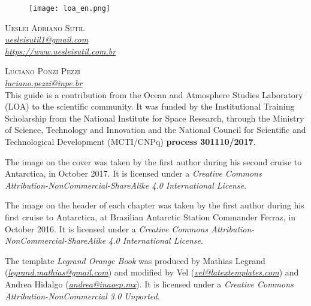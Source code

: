 \newpage
\thispagestyle{empty}

\begin{figure}[H]
    \centering
    \vspace*{\fill}
    \texttt{[image: loa\_en.png]}
    \vspace{0.5cm}
\end{figure}

\noindent \textsc{Ueslei Adriano Sutil} 
\\
\noindent \textcolor{bleu_cite}{\href{mailto:uesleisutil1@gmail.com}{\textit{uesleisutil1@gmail.com}}}
\\  %
\noindent \textcolor{bleu_cite}{\href{https://www.uesleisutil.com.br}{\textit{https://www.uesleisutil.com.br}}}
\bigskip

\noindent \textsc{Luciano Ponzi Pezzi}
\\
\noindent \textcolor{bleu_cite}{\href{mailto:luciano.pezzi@inpe.br}{\textit{luciano.pezzi@inpe.br}}}  %
\bigskip
\\

\noindent This guide is a contribution from the Ocean and Atmosphere Studies Laboratory (LOA)
to the scientific community. It was funded by the Institutional Training Scholarship from the National Institute for Space Research, 
through the Ministry of Science, Technology and Innovation and the National Council for Scientific and Technological Development (MCTI/CNPq) 
\textbf{process 301110/2017}.
\bigskip

\noindent The image on the cover was taken by the first author during his second cruise to Antarctica,
in October 2017. It is licensed under a \textit{Creative Commons Attribution-NonCommercial-ShareAlike 4.0 International License}. 
\bigskip

\noindent The image on the header of each chapter was taken by the first author during his first cruise to Antarctica, at Brazilian Antarctic Station Commander Ferraz, in October 2016. 
It is licensed under a \textit{Creative Commons Attribution-NonCommercial-ShareAlike 4.0 International License}. 
\bigskip

\noindent The template \textit{Legrand Orange Book} was produced by Mathias Legrand (\textcolor{bleu_cite}{\href{mailto:legrand.mathias@gmail.com}{\textit{legrand.mathias@gmail.com}}}) 
and modified by Vel (\textcolor{bleu_cite}{\href{mailto:vel@latextemplates.com}{\textit{vel@latextemplates.com}}}) and Andrea Hidalgo (\textcolor{bleu_cite}{\href{mailto:andrea@inaoep.mx}{\textit{andrea@inaoep.mx}}}). 
It is licensed under a \textit{Creative Commons Attribution-NonCommercial 3.0 Unported}.
\bigskip

